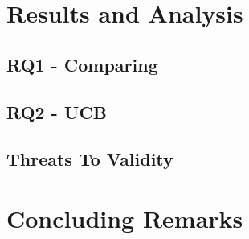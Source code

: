 \documentclass[sigconf]{acmart}
\begin{document}
\section{Results and Analysis}
\label{sec:results}

\subsection{RQ1 - Comparing}

\subsection{RQ2 - UCB}

\subsection{Threats To Validity}
\label{sec:results:threats}

\section{Concluding Remarks}
\label{sec:conclusion}

\balance

 
\end{document}
